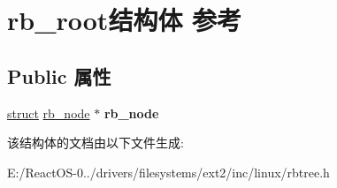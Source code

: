 \hypertarget{structrb__root}{}\section{rb\+\_\+root结构体 参考}
\label{structrb__root}
\subsection*{Public 属性}
\begin{DoxyCompactItemize}
\item 
\mbox{\label{structrb__root_a33f7d97bcf4287552d4e704c91bf0b18}} 
\hyperlink{interfacestruct}{struct} \hyperlink{structrb__node}{rb\+\_\+node} $\ast$ {\bfseries rb\+\_\+node}
\end{DoxyCompactItemize}


该结构体的文档由以下文件生成\+:\begin{DoxyCompactItemize}
\item 
E\+:/\+React\+O\+S-\/0../drivers/filesystems/ext2/inc/linux/rbtree.\+h\end{DoxyCompactItemize}
